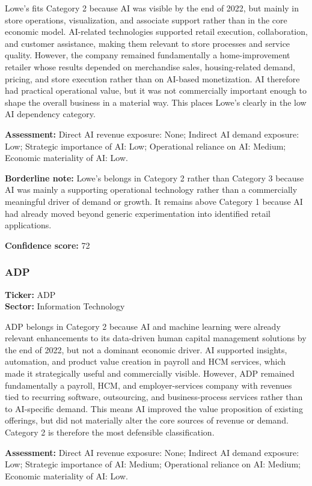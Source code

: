 \documentclass{article}
\begin{document}
Lowe's fits Category 2 because AI was visible by the end of 2022, but mainly in store operations, visualization, and associate support rather than in the core economic model. AI-related technologies supported retail execution, collaboration, and customer assistance, making them relevant to store processes and service quality. However, the company remained fundamentally a home-improvement retailer whose results depended on merchandise sales, housing-related demand, pricing, and store execution rather than on AI-based monetization. AI therefore had practical operational value, but it was not commercially important enough to shape the overall business in a material way. This places Lowe's clearly in the low AI dependency category.

\textbf{Assessment:} Direct AI revenue exposure: None; Indirect AI demand exposure: Low; Strategic importance of AI: Low; Operational reliance on AI: Medium; Economic materiality of AI: Low.

\textbf{Borderline note:} Lowe's belongs in Category 2 rather than Category 3 because AI was mainly a supporting operational technology rather than a commercially meaningful driver of demand or growth. It remains above Category 1 because AI had already moved beyond generic experimentation into identified retail applications.

\textbf{Confidence score:} 72

\subsubsection*{ADP}
\textbf{Ticker:} ADP \\
\textbf{Sector:} Information Technology

ADP belongs in Category 2 because AI and machine learning were already relevant enhancements to its data-driven human capital management solutions by the end of 2022, but not a dominant economic driver. AI supported insights, automation, and product value creation in payroll and HCM services, which made it strategically useful and commercially visible. However, ADP remained fundamentally a payroll, HCM, and employer-services company with revenues tied to recurring software, outsourcing, and business-process services rather than to AI-specific demand. This means AI improved the value proposition of existing offerings, but did not materially alter the core sources of revenue or demand. Category 2 is therefore the most defensible classification.

\textbf{Assessment:} Direct AI revenue exposure: None; Indirect AI demand exposure: Low; Strategic importance of AI: Medium; Operational reliance on AI: Medium; Economic materiality of AI: Low.
\end{document}
